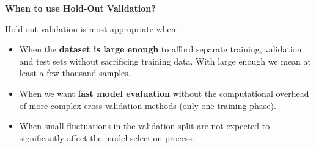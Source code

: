 \highspace
\begin{flushleft}
    \textcolor{Green3}{ \textbf{When to use Hold-Out Validation?}}
\end{flushleft}
Hold-out validation is most appropriate when:
\begin{itemize}
    \item[\textcolor{Green3}{\faIcon{check}}] When the \textbf{dataset is large enough} to afford separate training, validation and test sets without sacrificing training data. With large enough we mean at least a few thousand samples.
    \item[\textcolor{Green3}{\faIcon{check}}] When we want \textbf{fast model evaluation} without the computational overhead of more complex cross-validation methods (only one training phase).
    \item[\textcolor{Green3}{\faIcon{check}}] When small fluctuations in the validation split are not expected to significantly affect the model selection process.
\end{itemize}